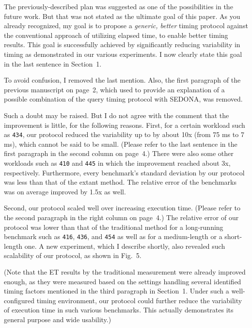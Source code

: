 \documentclass[10pt,letterpaper]{article}
\newenvironment{myindentpar}[1]%
{\begin{list}{}
         {\vspace{10pt}
					\setlength{\leftmargin}{#1}}
          \item[]
}
{\end{list}}
\newcommand{\rev}[1]{\begin{myindentpar}{.25in} {\em {\color{blue}{#1}}}\end{myindentpar}}
\begin{document}
The previously-described plan was suggested as one of the possibilities 
in the future work. But that was not stated as the ultimate goal of this paper. 
As you already recognized, my goal is to propose a {\em generic, better} timing protocol against the 
conventional approach of utilizing elapsed time, 
to enable better timing results. This goal is successfully achieved 
by significantly reducing variability in timing as demonstrated in our various experiments. 
I now clearly state this goal in the last sentence in Section~1. 

To avoid confusion, I removed the last mention. Also, the first paragraph of the previous manuscript on page~2, 
which used to provide an explanation of a possible combination of the query timing protocol 
with SEDONA, was removed.

\rev{
(2) If the proposed approach is for a generic purpose, there is a strong
doubt about usability. The improvement of the SEDONA is little. And the
extent of the each benchmark’s improvement described in Table 3
varies widely. Thus, the experimental results does not confirm whether
the SEDONA is widely practical or is useful. The description to clarify
the SEDONA’s characteristics is needed.
} 

Such a doubt may be raised. But I do not agree with the comment that the improvement is little, 
for the following reasons.
First, for a certain workload such as {\tt 434}, 
our protocol reduced the variability up to by about 10x 
(from 75 ms to 7 ms), 
which cannot be said to be small. (Please refer to the last sentence 
in the first paragraph in the second column on page~4.)
There were also some other workloads such as {\tt 410} and {\tt 445} 
in which the improvement reached about 3x, respectively. 
Furthermore, every benchmark's standard deviation by our protocol 
was less than that of the extant method. 
The relative error of the benchmarks was on average improved 
by 1.5x as well.

Second, our protocol scaled well over increasing execution time. 
(Please refer to the second paragraph in the right column on page~4.)
The relative error of our protocol was lower than that of the traditional method 
for a long-running benchmark such as {\tt 416}, {\tt 436}, and {\tt 454} 
as well as for a medium-length or a short-length one. 
A new experiment, 
which I describe shortly, also revealed 
such scalability of our protocol, as shown in Fig.~5.

(Note that the ET results by the traditional measurement were already 
improved enough, as they were measured based 
on the settings handling several identified timing factors mentioned in the third paragraph 
in Section~1. Under such a well-configured timing environment, our protocol could further 
reduce the variability of execution time in such various benchmarks. 
This actually demonstrates its general purpose and wide usability.)
\end{document}
